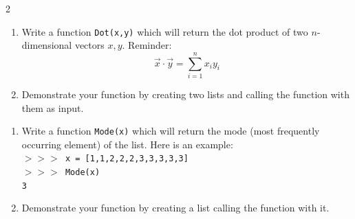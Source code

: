 \documentclass[12pt]{article}%
\newcommand{\code}[1]{\texttt{#1}}
\newcommand{\shp}{$>>>$ }
\begin{document}
\begin{multicols*}{2}
\begin{Exercise}[origin={25 points}]
\begin{enumerate}
\item Write a function \code{Dot(x,y)} which will return the dot product of two $n$-dimensional vectors $x,y$. Reminder:
\begin{equation*}
\vec x \cdot \vec y = \sum_{i=1}^n x_i y_i
\end{equation*}
\item Demonstrate your function by creating two lists and calling the function with them as input.
\end{enumerate}

\end{Exercise}

\begin{Exercise}[origin={25 points}]

\begin{enumerate}
\item Write a function \code{Mode(x)} which will return the mode (most frequently occurring element) of the list. Here is an example: \\
\code{\shp x = [1,1,2,2,2,3,3,3,3,3] \\
\shp Mode(x) \\
3
}
\item Demonstrate your function by creating a list calling the function with it.
\end{enumerate}

\end{Exercise}

\end{multicols*}
\end{document}
